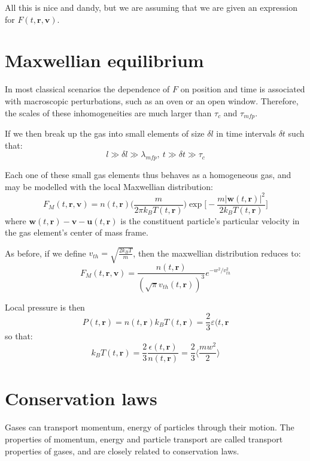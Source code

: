 \documentclass[a4paper,11pt,oneside]{book}
\newcommand{\BF}[1]{\boldsymbol{#1}}
\begin{document}
All this is nice and dandy, but we are assuming that we are given an expression for $F(t,\BF{r}, \BF{v})$. 

\section{Maxwellian equilibrium}
In most classical scenarios the dependence of $F$ on position and time is associated with macroscopic perturbations, such as an oven or an open window. Therefore, the scales of these inhomogeneities are much larger than $\tau_c$ and $\tau_{mfp}$. 


If we then break up the gas into small elements of size $\delta l$ in time intervals $\delta t$ such that:
\begin{equation}
    l \gg \delta l \gg \lambda_{mfp}, \ t \gg \delta t \gg \tau_c
\end{equation}

Each one of these small gas elements thus behaves as a homogeneous gas, and may be modelled with the local Maxwellian distribution:
\begin{equation}
    F_M(t, \BF{r}, \BF{v}) = n(t,\BF{r}) \bigg(\frac{m}{2\pi k_B T(t,\BF{r})}\bigg) \exp \bigg[-\frac{m|\BF{w}(t,\BF{r})|^2}{2k_B T(t,\BF{r})}\bigg]
\end{equation}
where $\BF{w}(t,\BF{r})-\BF{v}-\BF{u}(t,\BF{r})$ is the constituent particle's particular velocity in the gas element's center of mass frame. 

As before, if we define $v_{th} = \sqrt{\frac{2k_BT}{m}}$, then the maxwellian distribution reduces to:
\begin{equation}
    F_M(t, \BF{r}, \BF{v})  = \frac{n(t,\BF{r})}{(\sqrt{\pi} v_{th}(t,\BF{r}))^3} e^{-w^2/v_{th}^2}
\end{equation}

Local pressure is then
\begin{equation}
    P(t,\BF{r}) = n(t,\BF{r}) k_B T(t,\BF{r}) = \frac{2}{3}\varepsilon(t, \BF{r}
\end{equation}
so that:
\begin{equation}
    k_B T(t,\BF{r}) = \frac{2}{3}\frac{\epsilon(t,\BF{r})}{n(t,\BF{r})} = \frac{2}{3} \bigg \langle \frac{mw^2}{2} \bigg \rangle
\end{equation}
\section{Conservation laws}
Gases can transport momentum, energy of particles through their motion. The properties of momentum, energy and particle transport are called transport properties of gases, and are closely related to conservation laws.
\end{document}
